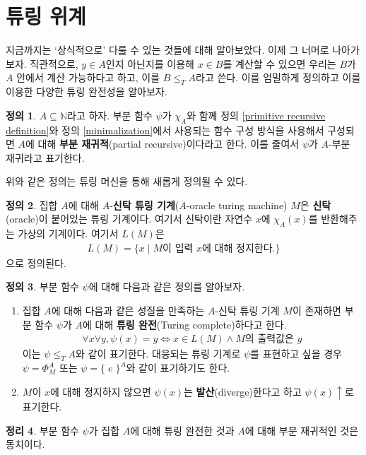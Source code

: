 \documentclass[b5paper, 11pt]{book}
\theoremstyle{definition}
\newtheorem{defn}{정의}[chapter]
\newtheorem{thm}[defn]{정리}
\begin{document}
\section{튜링 위계}
지금까지는 `상식적으로' 다룰 수 있는 것들에 대해 알아보았다. 이제 그 너머로 나아가보자.
직관적으로, $y \in A$인지 아닌지를 이용해 $x \in B$를 계산할 수 있으면 우리는 $B$가 $A$ 안에서 계산 가능하다고 하고, 이를 $B \le_T A$라고 쓴다. 이를 엄밀하게 정의하고 이를 이용한 다양한 튜링 완전성을 알아보자.
\begin{defn}
    $A \subseteq \mathbb{N}$라고 하자. 부분 함수 $\psi$가 
    $\chi_A$와 함께 정의 \ref{primitive recursive definition}와 정의 \ref{minimalization}에서 사용되는 함수 구성 방식을 사용해서 구성되면 $A$에 대해 \textbf{부분 재귀적}(partial recursive)이다라고 한다. 이를 줄여서 $\psi$가 $A$-부분 재귀라고 표기한다.
\end{defn}
위와 같은 정의는 튜링 머신을 통해 새롭게 정의될 수 있다.
\begin{defn}
    집합 $A$에 대해 $A$-\textbf{신탁 튜링 기계}($A$-oracle turing machine) $M$은 \textbf{신탁}(oracle)이 붙어있는 튜링 기계이다. 여기서 신탁이란 자연수 $x$에 $\chi_A(x)$를 반환해주는 가상의 기계이다. 여기서 $L(M)$은 
    \begin{align*}
        L(M) = \{x \;\vert\; M\text{이 입력 } x\text{에 대해 정지한다.} \}
    \end{align*}
    으로 정의된다.
\end{defn}
\begin{defn}
    부분 함수 $\psi$에 대해 다음과 같은 정의를 알아보자.
    \begin{enumerate}
        \item 집합 $A$에 대해 다음과 같은 성질을 만족하는 $A$-신탁 튜링 기계 $M$이 존재하면 부분 함수 $\psi$가 $A$에 대해 \textbf{튜링 완전}(Turing complete)하다고 한다.
        \begin{align*}
            \forall x \forall y,  \psi(x) = y \Leftrightarrow 
            x \in L(M) \wedge M\text{의 출력값은 } y
        \end{align*} 
        이는 $\psi \le_T A$와 같이 표기한다. 대응되는 튜링 기계로 $\psi$를 표현하고 싶을 경우 $\psi = \Phi_M^A$ 또는 $\psi = \{\; e \; \}^A$와 같이 표기하기도 한다. 
        \item $M$이 $x$에 대해 정지하지 않으면 $\psi(x)$는 \textbf{발산}(diverge)한다고 하고
        $\psi(x) \uparrow$로 표기한다.
    \end{enumerate}
\end{defn}
\begin{thm}
    부분 함수 $\psi$가 집합 $A$에 대해 튜링 완전한 것과 $A$에 대해 부분 재귀적인 것은 동치이다.
\end{thm}
\end{document}

